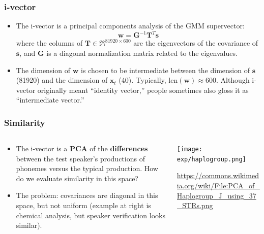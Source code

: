 \documentclass{beamer}
\begin{document}
\begin{frame}
  \frametitle{i-vector}

  \begin{itemize}
  \item 
    The i-vector is a principal components analysis of the GMM supervector:
    \begin{displaymath}
      \bm{w} =\bm{G}^{-1}\bm{T}^T \bm{s}
    \end{displaymath}
    where the columns of $\bm{T}\in\Re^{81920\times 600}$ are the
    eigenvectors of the covariance of $\bm{s}$, and $\bm{G}$ is a
    diagonal normalization matrix related to the eigenvalues.
  \item
    The dimension of $\bm{w}$ is chosen to be intermediate between the
    dimension of $\bm{s}$ (81920) and the dimension of $\bm{x}_t$
    (40).  Typically, $\text{len}(\bm{w})\approx 600$.  Although
    i-vector originally meant ``identity vector,'' people sometimes
    also gloss it as ``intermediate vector.''
  \end{itemize}
\end{frame}
        
\begin{frame}
  \frametitle{Similarity}

  \begin{columns}
    \begin{column}{0.5\textwidth}
      \begin{itemize}
        \item The i-vector is a \textbf{PCA} of the
          \textbf{differences} between the test speaker's productions
          of phonemes versus the typical production.  How do we
          evaluate similarity in this space?
        \item The problem: covariances are diagonal in this space, but
          not uniform (example at right is chemical analysis, but
          speaker verification looks similar).
      \end{itemize}
    \end{column}
    \begin{column}{0.5\textwidth}
      \centerline{\texttt{[image: exp/haplogroup.png]}}
      \url{https://commons.wikimedia.org/wiki/File:PCA_of_Haplogroup_J_using_37_STRs.png}
    \end{column}
  \end{columns}
\end{frame}
\end{document}
